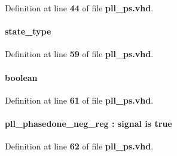 Definition at line {\bf 44} of file {\bf pll\+\_\+ps.\+vhd}.

\paragraph[{next\+\_\+state}]{ {\bfseries {\bfseries {\bf state\+\_\+type}} \textcolor{vhdlchar}{ }} \hspace{0.3cm}{\ttfamily [Signal]}}\label{classpll__ps_1_1arch_a7b92f98d060e763f3dd6fa727ddb03d8}


Definition at line {\bf 59} of file {\bf pll\+\_\+ps.\+vhd}.

\paragraph[{noprune}]{ {\bfseries \textcolor{comment}{boolean}\textcolor{vhdlchar}{ }} \hspace{0.3cm}{\ttfamily [Attribute]}}\label{classpll__ps_1_1arch_a2591245f99d39267157261d7823cf9ed}


Definition at line {\bf 61} of file {\bf pll\+\_\+ps.\+vhd}.

\paragraph[{noprune}]{ {\bfseries {\bfseries {\bf pll\+\_\+phasedone\+\_\+neg\+\_\+reg}} \textcolor{vhdlchar}{ }\textcolor{vhdlchar}{\+:}\textcolor{vhdlchar}{ }\textcolor{keywordflow}{signal}\textcolor{vhdlchar}{ }\textcolor{keywordflow}{is}\textcolor{vhdlchar}{ }\textcolor{vhdlchar}{ }\textcolor{vhdlchar}{ }\textcolor{vhdlchar}{ }\textcolor{vhdlchar}{true}\textcolor{vhdlchar}{ }} \hspace{0.3cm}{\ttfamily [Attribute]}}\label{classpll__ps_1_1arch_a7ffba453dd327c7d6ee076106d2d91a3}


Definition at line {\bf 62} of file {\bf pll\+\_\+ps.\+vhd}.

